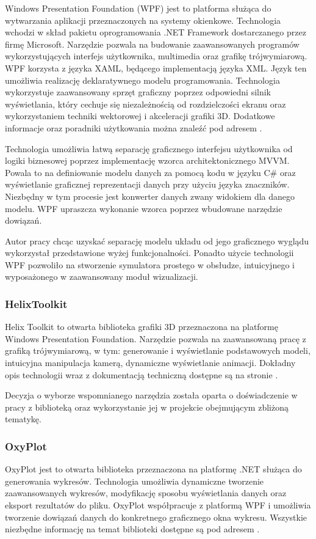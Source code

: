 \documentclass[12pt, twoside, openany]{report}
\theoremstyle{definition}
\begin{document}
Windows Presentation Foundation (WPF) jest to platforma służąca do wytwarzania aplikacji przeznaczonych na systemy okienkowe. Technologia wchodzi w skład pakietu oprogramowania .NET Framework dostarczanego przez firmę Microsoft. Narzędzie pozwala na budowanie zaawansowanych programów wykorzystujących interfejs użytkownika, multimedia oraz grafikę trójwymiarową. WPF korzysta z języka XAML, będącego implementacją języka XML. Język ten umożliwia realizację deklaratywnego modelu programowania. Technologia wykorzystuje zaawansowany sprzęt graficzny poprzez odpowiedni silnik wyświetlania, który cechuje się niezależnością od rozdzielczości ekranu oraz wykorzystaniem techniki wektorowej i akceleracji grafiki 3D. Dodatkowe informacje oraz poradniki użytkowania można znaleźć pod adresem \cite{WPF}.

Technologia umożliwia łatwą separację graficznego interfejsu użytkownika od logiki biznesowej poprzez implementację wzorca architektonicznego MVVM. Powala to na definiowanie modelu danych za pomocą kodu w języku C\# oraz wyświetlanie graficznej reprezentacji danych przy użyciu języka znaczników. Niezbędny w tym procesie jest konwerter danych zwany widokiem dla danego modelu. WPF upraszcza wykonanie wzorca poprzez wbudowane narzędzie dowiązań.

Autor pracy chcąc uzyskać separację modelu układu od jego graficznego wyglądu wykorzystał przedstawione wyżej funkcjonalności. Ponadto użycie technologii WPF pozwoliło na stworzenie symulatora prostego w obsłudze, intuicyjnego i wyposażonego w zaawansowany moduł wizualizacji.

\subsubsection{HelixToolkit}
Helix Toolkit to otwarta biblioteka grafiki 3D przeznaczona na platformę Windows Presentation Foundation. Narzędzie pozwala na zaawansowaną pracę z grafiką trójwymiarową, w tym: generowanie i wyświetlanie podstawowych modeli, intuicyjna manipulacja kamerą, dynamiczne wyświetlanie animacji. Dokładny opis technologii wraz z dokumentacją techniczną dostępne są na stronie \cite{HelixToolkit}.

Decyzja o wyborze wspomnianego narzędzia została oparta o doświadczenie w pracy z biblioteką oraz wykorzystanie jej w projekcie obejmującym zbliżoną tematykę.

\subsubsection{OxyPlot}
OxyPlot jest to otwarta biblioteka przeznaczona na platformę .NET służąca do generowania wykresów. Technologia umożliwia dynamiczne tworzenie zaawansowanych wykresów, modyfikację sposobu wyświetlania danych oraz eksport rezultatów do pliku. OxyPlot współpracuje z platformą WPF i umożliwia tworzenie dowiązań danych do konkretnego graficznego okna wykresu. Wszystkie niezbędne informację na temat biblioteki dostępne są pod adresem \cite{OxyPlot}.
\end{document}
